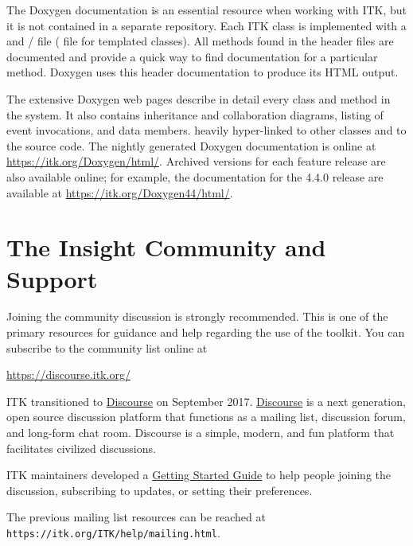 The Doxygen documentation is an essential resource when working with ITK, but
it is not contained in a separate repository. Each ITK class is implemented
with a  and / file ( file for
templated classes). All methods found in the  header files are
documented and provide a quick way to find documentation for a particular
method.  Doxygen uses this header documentation to produce its HTML output.

The extensive Doxygen web pages describe in detail every class and method in
the system. It also contains inheritance and collaboration diagrams, listing
of event invocations, and data members.  heavily hyper-linked to other classes
and to the source code. The nightly generated Doxygen documentation is online at
\url{https://itk.org/Doxygen/html/}. Archived versions for each feature release
are also available online; for example, the documentation for the 4.4.0
release are available at \url{https://itk.org/Doxygen44/html/}.


\section{The Insight Community and Support}
\label{sec:AdditionalResources}
\label{sec:JoinDiscussion}


Joining the community discussion is strongly recommended. This is one of the
primary resources for guidance and help regarding the use of the toolkit. You
can subscribe to the community list online at

\begin{center}
\url{https://discourse.itk.org/}
\end{center}

ITK transitioned to \href{https://www.discourse.org/}{Discourse} on September
2017. \href{https://www.discourse.org/}{Discourse} is a next generation, open
source discussion platform that functions as a mailing list, discussion forum,
and long-form chat room. Discourse is a simple, modern, and fun platform that
facilitates civilized discussions.

ITK maintainers developed a
\href{https://discourse.itk.org/t/getting-started-with-discourse/22}{Getting Started Guide}
to help people joining the discussion, subscribing to updates, or setting their
preferences.

The previous mailing list resources can be reached at
\texttt{https://itk.org/ITK/help/mailing.html}.

